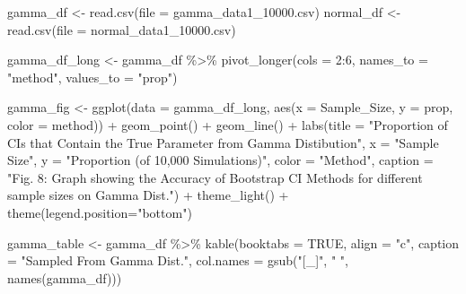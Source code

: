 \documentclass[12pt]{article}
\newenvironment{Shaded}{\begin{snugshade}}{\end{snugshade}}
\newcommand{\AttributeTok}[1]{\textcolor[rgb]{0.77,0.63,0.00}{#1}}
\newcommand{\ConstantTok}[1]{\textcolor[rgb]{0.00,0.00,0.00}{#1}}
\newcommand{\DecValTok}[1]{\textcolor[rgb]{0.00,0.00,0.81}{#1}}
\newcommand{\FunctionTok}[1]{\textcolor[rgb]{0.00,0.00,0.00}{#1}}
\newcommand{\NormalTok}[1]{#1}
\newcommand{\OtherTok}[1]{\textcolor[rgb]{0.56,0.35,0.01}{#1}}
\newcommand{\SpecialCharTok}[1]{\textcolor[rgb]{0.00,0.00,0.00}{#1}}
\newcommand{\StringTok}[1]{\textcolor[rgb]{0.31,0.60,0.02}{#1}}
\begin{document}
\begin{Shaded}
\begin{Highlighting}[]
\NormalTok{gamma\_df }\OtherTok{\textless{}{-}} \FunctionTok{read.csv}\NormalTok{(}\AttributeTok{file =} \StringTok{\textquotesingle{}gamma\_data1\_10000.csv\textquotesingle{}}\NormalTok{)}
\NormalTok{normal\_df }\OtherTok{\textless{}{-}} \FunctionTok{read.csv}\NormalTok{(}\AttributeTok{file =} \StringTok{\textquotesingle{}normal\_data1\_10000.csv\textquotesingle{}}\NormalTok{)}

\NormalTok{gamma\_df\_long }\OtherTok{\textless{}{-}}\NormalTok{ gamma\_df }\SpecialCharTok{\%\textgreater{}\%}
  \FunctionTok{pivot\_longer}\NormalTok{(}\AttributeTok{cols =} \DecValTok{2}\SpecialCharTok{:}\DecValTok{6}\NormalTok{, }\AttributeTok{names\_to =} \StringTok{"method"}\NormalTok{, }\AttributeTok{values\_to =} \StringTok{"prop"}\NormalTok{) }
    
\NormalTok{gamma\_fig }\OtherTok{\textless{}{-}} \FunctionTok{ggplot}\NormalTok{(}\AttributeTok{data =}\NormalTok{ gamma\_df\_long, }
                    \FunctionTok{aes}\NormalTok{(}\AttributeTok{x =}\NormalTok{ Sample\_Size, }\AttributeTok{y =}\NormalTok{ prop, }\AttributeTok{color =}\NormalTok{ method)) }\SpecialCharTok{+} 
  \FunctionTok{geom\_point}\NormalTok{() }\SpecialCharTok{+} \FunctionTok{geom\_line}\NormalTok{() }\SpecialCharTok{+} 
  \FunctionTok{labs}\NormalTok{(}\AttributeTok{title =} \StringTok{"Proportion of CIs that Contain the True Parameter from Gamma }
\StringTok{       Distibution"}\NormalTok{, }\AttributeTok{x =} \StringTok{"Sample Size"}\NormalTok{, }
       \AttributeTok{y =} \StringTok{"Proportion (of 10,000 Simulations)"}\NormalTok{, }\AttributeTok{color =} \StringTok{"Method"}\NormalTok{,}
       \AttributeTok{caption =} \StringTok{"Fig. 8: Graph showing the Accuracy of Bootstrap CI Methods for different sample sizes on Gamma Dist."}\NormalTok{) }\SpecialCharTok{+}
  \FunctionTok{theme\_light}\NormalTok{() }\SpecialCharTok{+}
  \FunctionTok{theme}\NormalTok{(}\AttributeTok{legend.position=}\StringTok{"bottom"}\NormalTok{)}
      
\NormalTok{gamma\_table }\OtherTok{\textless{}{-}}\NormalTok{ gamma\_df }\SpecialCharTok{\%\textgreater{}\%}
  \FunctionTok{kable}\NormalTok{(}\AttributeTok{booktabs =} \ConstantTok{TRUE}\NormalTok{, }\AttributeTok{align =} \StringTok{"c"}\NormalTok{, }\AttributeTok{caption =} \StringTok{"Sampled From Gamma Dist."}\NormalTok{, }
        \AttributeTok{col.names =} \FunctionTok{gsub}\NormalTok{(}\StringTok{"[\_]"}\NormalTok{, }\StringTok{" "}\NormalTok{, }\FunctionTok{names}\NormalTok{(gamma\_df))) }
    

\end{Highlighting}
\end{Shaded}
\end{document}
